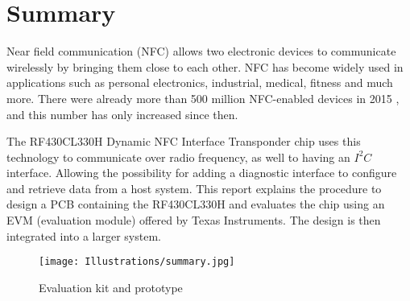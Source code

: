 \chapter*{Summary}
Near field communication (NFC) allows two electronic devices to communicate wirelessly by bringing them close to each other. NFC has become widely used in applications such as personal electronics, industrial, medical, fitness and much more. There were already more than 500 million NFC-enabled devices in 2015 \cite{Texas2015}, and this number has only increased since then. 

The RF430CL330H Dynamic NFC Interface Transponder chip uses this technology to communicate over radio frequency, as well to having an $I^2C$ interface. Allowing the possibility for adding a diagnostic interface to configure and retrieve data from a host system. This report explains the procedure to design a PCB containing the RF430CL330H and evaluates the chip using an EVM (evaluation module) offered by Texas Instruments. The design is then integrated into a larger system. 
\begin{figure}[h]
\begin{center}
\center
\texttt{[image: Illustrations/summary.jpg]}  
\caption{Evaluation kit and prototype}
\label{prototype}
\end{center}
\end{figure}
